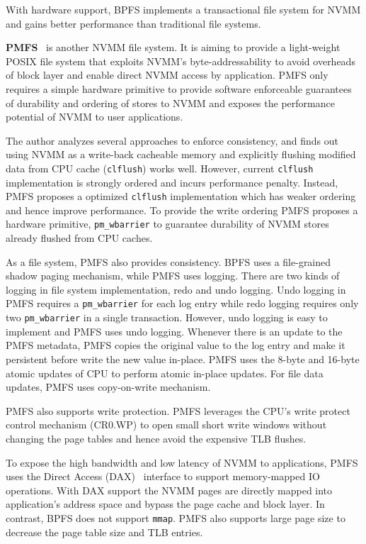 With hardware support, BPFS implements a transactional file system for NVMM
and gains better performance than traditional file systems.


\textbf{PMFS}~\cite{PMFS} is another NVMM file system. It is aiming to
provide a
light-weight POSIX file system that exploits NVMM's byte-addressability to
avoid overheads of block layer and enable direct NVMM access by application.
PMFS only requires a simple hardware primitive to provide software enforceable
guarantees of durability and ordering of stores to NVMM and exposes the 
performance potential of NVMM to user applications.

The author analyzes several approaches to enforce consistency, and finds out
using NVMM as a write-back cacheable memory and explicitly flushing modified
data from CPU cache (\texttt{clflush}) works well.
However, current \texttt{clflush}
implementation is strongly ordered and incurs performance penalty. Instead,
PMFS proposes a optimized \texttt{clflush} implementation which has  weaker
 ordering
and hence improve performance. To provide the write ordering PMFS proposes
a hardware primitive, \texttt{pm\_wbarrier} to guarantee durability of NVMM stores
already flushed from CPU caches.

As a file system, PMFS also provides consistency. BPFS uses a file-grained
shadow paging mechanism, while PMFS uses logging. There are two kinds of logging
in file system implementation, redo and undo logging. Undo logging in PMFS
requires a \texttt{pm\_wbarrier} for each log entry while redo logging requires
only two \texttt{pm\_wbarrier} in a single transaction. However, undo logging
is easy to implement and PMFS uses undo logging. Whenever there is an update
to the PMFS metadata, PMFS copies the original value to the log entry and
make it persistent before write the new value in-place. PMFS uses the
8-byte and 16-byte atomic updates of CPU to perform atomic in-place updates.
For file data updates, PMFS uses copy-on-write mechanism.

PMFS also supports write protection. PMFS leverages
the CPU's write protect control mechanism (CR0.WP) to open small short write
windows without changing the page tables and hence avoid the expensive
TLB flushes.

To expose the high bandwidth and low latency of NVMM to applications,
PMFS uses the Direct Access (DAX)~\cite{ext4dax} interface to support
memory-mapped
IO operations. With DAX support the NVMM pages are directly mapped into
application's address space and bypass the page cache and block layer.
In contrast, BPFS does not support \texttt{mmap}.
PMFS also supports large page size to decrease the page table size and
TLB entries.

